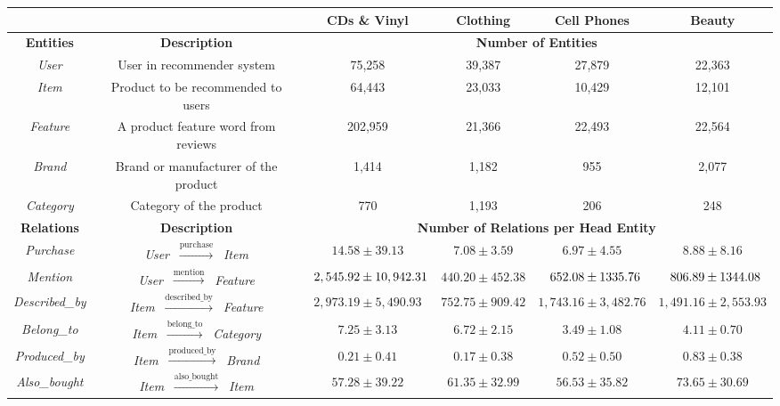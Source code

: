 \documentclass[sigconf]{acmart}
\begin{document}
\begin{table}[t]
\small
\centering
\begin{tabular}{cccccc}
\hline
& & \textbf{CDs \& Vinyl} & \textbf{Clothing} & \textbf{Cell Phones} & \textbf{Beauty} \\
\hline
\textbf{Entities} & \textbf{Description} & \multicolumn{4}{c}{\textbf{Number of Entities}} \vspace{0.2em} \\
\emph{User} & User in recommender system & \hphantom{0}75,258  & 39,387 & 27,879 & 22,363 \\
\emph{Item} & Product to be recommended to users & \hphantom{0}64,443  & 23,033 & 10,429 & 12,101 \\
\emph{Feature} & A product feature word from reviews & 202,959 & 21,366 & 22,493 & 22,564 \\
\emph{Brand} & Brand or manufacturer of the product & \hphantom{00}1,414   & \hphantom{0}1,182  & \hphantom{00,}955   & \hphantom{0}2,077 \\
\emph{Category} & Category of the product & \hphantom{000,}770     & \hphantom{0}1,193  & \hphantom{00,}206    & \hphantom{00,}248 \\
\hline
\textbf{Relations} & \textbf{Description} & \multicolumn{4}{c}{\textbf{Number of Relations per Head Entity}} \vspace{0.2em} \\
\emph{Purchase} & \emph{User} $~\xrightarrow{\text{purchase}}~$ \emph{Item} & $14.58\pm39.13$ &  $7.08\pm3.59$ & $6.97\pm4.55$ & $8.88\pm8.16$ \\
\emph{Mention} & \emph{User} $~\xrightarrow{\text{mention}}~$ \emph{Feature} & $\hphantom{0}2,545.92\pm10,942.31$ & $440.20\pm452.38$ & $\hphantom{0}652.08\pm1335.76$ & $\hphantom{0}806.89\pm1344.08$ \\
\emph{Described\_by} & \emph{Item} $~\xrightarrow{\text{described\_by}}~$ \emph{Feature} & $2,973.19\pm5,490.93$ & $752.75\pm909.42$ & $1,743.16\pm3,482.76$ & $1,491.16\pm2,553.93$ \\
\emph{Belong\_to} & \emph{Item} $~\xrightarrow{\text{belong\_to}}~$ \emph{Category} & $7.25\pm3.13$ & $6.72\pm2.15$ & $3.49\pm1.08$ & $4.11\pm0.70$ \\
\emph{Produced\_by} & \emph{Item} $~\xrightarrow{\text{produced\_by}}~$ \emph{Brand} & $0.21\pm0.41$ & $0.17\pm0.38$ & $0.52\pm0.50$ & $0.83\pm0.38$ \\
\emph{Also\_bought} & \emph{Item} $~\xrightarrow{\text{also\_bought}}~$ \emph{Item} & $57.28\pm39.22$ & $61.35\pm32.99$ & $56.53\pm35.82$ & $73.65\pm30.69$ \\

\end{tabular}
\end{table}
\end{document}
